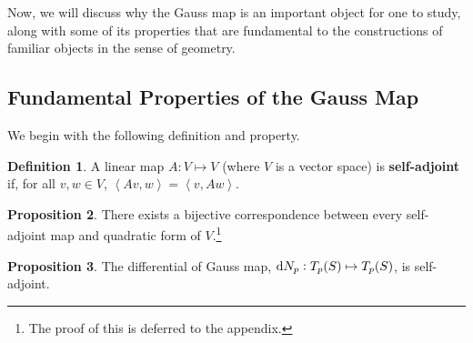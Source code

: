 \documentclass{amsart} %
\theoremstyle{mytheoremstyle}
\theoremstyle{definition}
\newtheorem{definition}{Definition}[section]
\newtheorem{proposition}[definition]{Proposition}
\numberwithin{equation}{section}
\DeclareMathOperator{\1}{\mathbbm{1}}
\DeclareMathOperator{\D}{\dif}
\newcommand{\innerproduct}[2]{\left\langle #1,#2 \right\rangle}
\begin{document}
Now, we will discuss why the Gauss map is an important object for one to study, along with some of its properties that are fundamental to the constructions of familiar objects in the sense of geometry.

\subsection{Fundamental Properties of the Gauss Map}
We begin with the following definition and property.

\begin{definition}
	\label{defselfadjoint}
	A linear map $A : V \mapsto V$ (where $V$ is a vector space) is \textbf{self-adjoint} if, for all $v,w \in V$, $\innerproduct{Av}{w} = \innerproduct{v}{Aw}$.
\end{definition}

\begin{proposition}
	\label{propselfadjointquadraticform}
	There exists a bijective correspondence between every self-adjoint map and quadratic form of $V$.\footnote{The proof of this is deferred to the appendix.}
\end{proposition}

\begin{proposition}
	\label{propgaussmapdifferentialselfadjoint}
	The differential of Gauss map, $\D N_p : T_p (S) \mapsto T_p (S)$, is self-adjoint.
\end{proposition}
\end{document}
